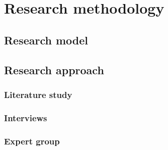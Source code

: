 
\chapter{Research methodology} \label{research_methodology}
\lipsum[1-1]

\section{Research model} \label{research_model}
\lipsum[1-1]

\section{Research approach} \label{research_approach}
\lipsum[1-1]

\subsection{Literature study} \label{literature_study}
\lipsum[1-1]

\subsection{Interviews} \label{interviews}
\lipsum[1-1]

\subsection{Expert group} \label{expert_group}
\lipsum[1-1]